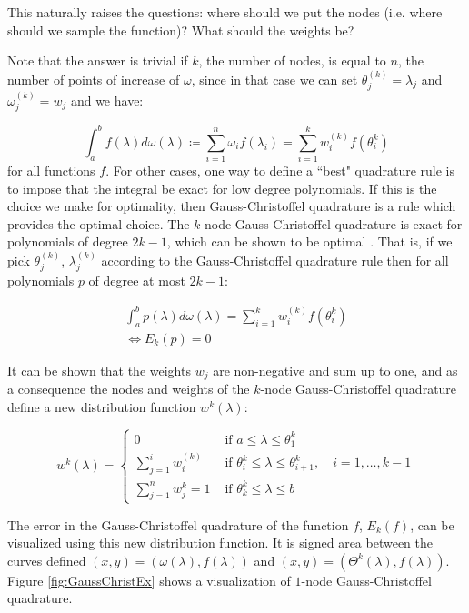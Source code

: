 \documentclass[10pt,a4paper]{article}
\begin{document}
This naturally raises the questions: where should we put the nodes (i.e. where should we sample the function)? What should the weights be?

Note that the answer is trivial if $k$, the number of nodes, is equal to $n$, the number of points of increase of $\omega$, since in that case we can set $\theta_j^{(k)}  = \lambda_j $ and $\omega_j^{(k)} = w_j$ and we have:

\begin{equation}
\int_a^b f(\lambda) d\omega(\lambda) \coloneqq \sum_{i=1}^n \omega_i f \left( \lambda_i \right) = \sum_{i=1}^{k} w_i^{(k)} f(\theta_i^k)
\end{equation}
for all functions $f$.
For other cases, one way to define a ``best" quadrature rule is to impose that the integral be exact for low degree polynomials. If this is the choice we make for optimality, then Gauss-Christoffel quadrature is a rule which provides the optimal choice. The $k$-node Gauss-Christoffel quadrature is exact for polynomials of degree $2k-1$, which can be shown to be optimal \cite{liesen_strakoss_zdenek_2013}. That is, if we pick $\theta_j^{(k)}$, $\lambda_j^{(k)}$ according to the Gauss-Christoffel quadrature rule then for all polynomials $p$ of degree at most $2k-1$:

\begin{align}
\int_a^b p(\lambda) d\omega(\lambda) = \sum_{i=1}^{k} w_i^{(k)} f(\theta_i^k) \\
\iff E_k(p) =0
\end{align}

It can be shown that the weights $w_j$ are non-negative and sum up to one, and as a consequence the nodes and weights of the $k$-node Gauss-Christoffel quadrature define a new distribution function $w^k(\lambda)$:

\begin{equation} 
w^k(\lambda) = \begin{cases}
0 & \text{ if } a \leq \lambda \leq  \theta_1^k   \\
\sum_{j=1}^i w_i^{(k)}& \text{ if }\theta_i^k\leq \lambda \leq \theta_{i+1}^k,   \quad i = 1,\dots,k-1   \\
\sum_{j=1}^n w_j^k = 1 & \text{ if } \theta_k^k \leq \lambda \leq b     
\end{cases}
\end{equation} 

The error in the Gauss-Christoffel quadrature of the function $f$, $E_k(f)$, can be visualized using this new distribution function. It is signed area between the curves defined  $(x,y) = \left( \omega(\lambda), f(\lambda) \right)$ and $(x,y) = \left( \Theta^k(\lambda), f(\lambda) \right)$. Figure \ref{fig:GaussChristEx} shows a visualization of $1$-node Gauss-Christoffel quadrature.
\end{document}
